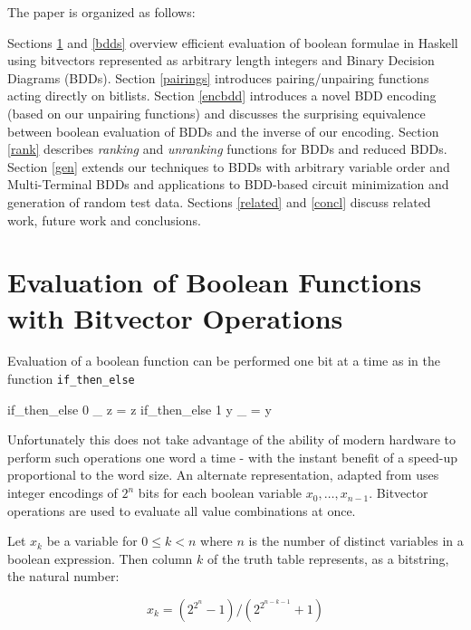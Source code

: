 \documentclass[]{INCLUDES/llncs}
\begin{document}
The paper is organized as follows:

Sections \ref{bits} and \ref{bdds} overview efficient evaluation of boolean
formulae in Haskell using bitvectors represented as arbitrary length integers
and Binary Decision Diagrams (BDDs).
Section \ref{pairings} introduces pairing/unpairing
functions acting directly on bitlists.
Section \ref{encbdd} introduces a novel BDD encoding (based on our unpairing
functions) and discusses the surprising equivalence between boolean evaluation of BDDs
and the inverse of our encoding.
Section \ref{rank} describes {\em ranking} and {\em unranking}
functions for BDDs and reduced BDDs.
Section \ref{gen} extends our techniques to BDDs with arbitrary variable
order and Multi-Terminal BDDs and
applications to BDD-based circuit minimization and generation of random test
data.
Sections \ref{related} and \ref{concl}
discuss related work, future work and conclusions.

\begin{comment}
\begin{code}
module BDD where
import Data.List
import Data.Bits
import Data.Array
import Random
\end{code}
\end{comment}

\section{Evaluation of Boolean 
Functions with Bitvector Operations}\label{bits}

Evaluation of a boolean function can be performed one 
bit at a time as in the function {\tt if\_then\_else}
\begin{code}
if_then_else 0 _ z = z
if_then_else 1 y _ = y
\end{code}
Unfortunately this does not take advantage of the ability of modern hardware to
perform such operations one word a time - with the instant benefit of a
speed-up proportional to the word size.
An alternate representation, adapted
from \cite{knuth06draft} uses integer encodings 
of $2^n$ bits for each boolean variable $x_0,\ldots,x_{n-1}$. 
Bitvector operations are used to evaluate all
value combinations at once.

\begin{prop}
Let $x_k$ be a variable for $0 \leq k<n$
where $n$ is the number of distinct variables in a 
boolean expression. Then column $k$ of the truth table
represents, as a bitstring, the natural number:

\begin{equation} \label{var}
x_k={(2^{2^n}-1)}/{(2^{2^{n-k-1}}+1)} 
\end{equation}
\end{prop}
\end{document}
